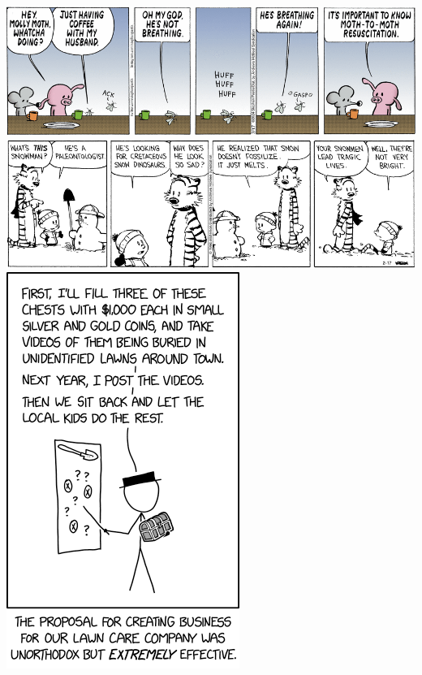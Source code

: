 \documentclass[landscape]{article}
\begin{document}
\begin{multicols}{3}
\renewcommand*\sudokuformat[1]{\sffamily#1}
\setlength{}
\setlength\sudokuthickline{1pt}
\begin{center}
	
\end{center}
\setlength\sudokuthickline{0.3pt}
\begin{center}
	
\end{center}

\setnormallinewidth{0.3pt}
\setthicklinewidth{1pt}
\begin{center}
\begin{starbattle}
\framepuzzle
{}

\end{starbattle}
\end{center}

\center\includegraphics[width=\linewidth]{images/comic-pearls.png}
\center\includegraphics[width=\linewidth]{images/comic-calvinandhobbes.png}
\center\includegraphics[height=0.7\linewidth]{images/comic-xkcd.png}

\end{multicols}
\end{document}

